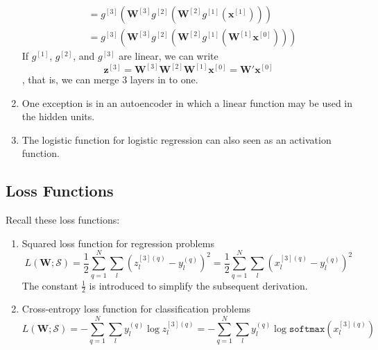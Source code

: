 \documentclass[11pt]{article}
\begin{document}
\begin{enumerate}
\begin{align*}
&= g^{[3]}(\mathbf{W}^{[3]} g^{[2]}(\mathbf{W}^{[2]} g^{[1]}(\mathbf{x}^{[1]})))\\
&= g^{[3]}(\mathbf{W}^{[3]} g^{[2]}(\mathbf{W}^{[2]} g^{[1]}(\mathbf{W}^{[1]} \mathbf{x}^{[0]})))
\end{align*}
If $g^{[1]}$, $g^{[2]}$, and $g^{[3]}$ are linear, we can write $$\mathbf{z}^{[3]} = \mathbf{W}^{[3]}\mathbf{W}^{[2]} \mathbf{W}^{[1]} \mathbf{x}^{[0]} = \mathbf{W'} \mathbf{x}^{[0]}$$, that is, we can merge 3 layers in to one.
\item One exception is in an autoencoder in which a linear function may be used in the hidden units.
\item The logistic function for logistic regression can also seen as an activation function.
\end{enumerate}
\subsection{Loss Functions}
Recall these loss functions:
\begin{enumerate}
\item Squared loss function for regression problems
$$L(\mathbf{W}; \mathcal{S}) = \frac{1}{2} \sum_{q=1}^{N} \sum_{l} (z_{l} ^{[3](q)} - y_{l}^{(q)})^2 = \frac{1}{2} \sum_{q=1}^{N} \sum_{l} (x_{l} ^{[3](q)} - y_{l}^{(q)})^2 $$ The constant $\frac{1}{2}$ is introduced to simplify the subsequent derivation.
\item Cross-entropy loss function for classification problems
$$L(\mathbf{W}; \mathcal{S}) = -\sum_{q=1}^{N} \sum_{l} y^{(q)}_l \log z_{l}^{[3] (q)} = -\sum_{q=1}^{N} \sum_{l} y^{(q)}_l \log \texttt{softmax}(x^{[3] (q)}_l)$$
\end{enumerate}
\end{document}
